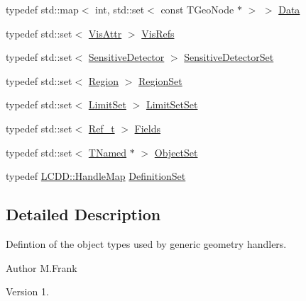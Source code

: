 \begin{DoxyCompactItemize}
\item 
typedef std\+::map$<$ int, std\+::set$<$ const T\+Geo\+Node $\ast$ $>$ $>$ \hyperlink{class_d_d4hep_1_1_geometry_1_1_geo_handler_types_a568935b7e878d3ea9fe97a2ecf33d641}{Data}
\item 
typedef std\+::set$<$ \hyperlink{class_d_d4hep_1_1_geometry_1_1_vis_attr}{Vis\+Attr} $>$ \hyperlink{class_d_d4hep_1_1_geometry_1_1_geo_handler_types_abeb370eb52c06e48c61e6c8bc19b66ab}{Vis\+Refs}
\item 
typedef std\+::set$<$ \hyperlink{class_d_d4hep_1_1_geometry_1_1_sensitive_detector}{Sensitive\+Detector} $>$ \hyperlink{class_d_d4hep_1_1_geometry_1_1_geo_handler_types_a16da960fef01a5643d04a029e524374f}{Sensitive\+Detector\+Set}
\item 
typedef std\+::set$<$ \hyperlink{class_d_d4hep_1_1_geometry_1_1_region}{Region} $>$ \hyperlink{class_d_d4hep_1_1_geometry_1_1_geo_handler_types_a871413f297c033590fb56dcba5cc7dac}{Region\+Set}
\item 
typedef std\+::set$<$ \hyperlink{class_d_d4hep_1_1_geometry_1_1_limit_set}{Limit\+Set} $>$ \hyperlink{class_d_d4hep_1_1_geometry_1_1_geo_handler_types_ae93bccfaccdbc36f0f5339c24aada447}{Limit\+Set\+Set}
\item 
typedef std\+::set$<$ \hyperlink{group___d_d4_h_e_p___g_e_o_m_e_t_r_y_ga40af83be6718bb8828a3d83dc7f8c930}{Ref\+\_\+t} $>$ \hyperlink{class_d_d4hep_1_1_geometry_1_1_geo_handler_types_ac82df292e19cfb74015cb798e54620b4}{Fields}
\item 
typedef std\+::set$<$ \hyperlink{class_t_named}{T\+Named} $\ast$ $>$ \hyperlink{class_d_d4hep_1_1_geometry_1_1_geo_handler_types_a1e77c8aec4a291253804630c590af1d8}{Object\+Set}
\item 
typedef \hyperlink{class_d_d4hep_1_1_geometry_1_1_l_c_d_d_a05cb11e7355772c7b0794bcca59bf477}{L\+C\+D\+D\+::\+Handle\+Map} \hyperlink{class_d_d4hep_1_1_geometry_1_1_geo_handler_types_a960cd930e1a491fc9a6afa5058865b4e}{Definition\+Set}
\end{DoxyCompactItemize}


\subsection{Detailed Description}
Defintion of the object types used by generic geometry handlers. 

\begin{DoxyAuthor}{Author}
M.\+Frank 
\end{DoxyAuthor}
\begin{DoxyVersion}{Version}
1. 
\end{DoxyVersion}


